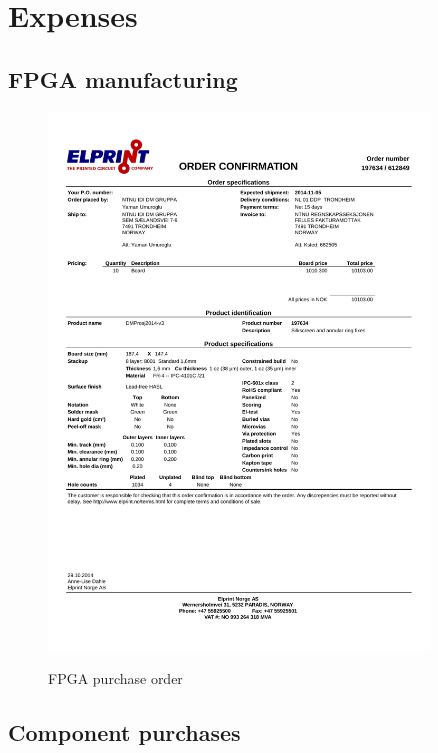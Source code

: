 \documentclass[../main/report.tex]{subfiles}
\begin{document}
\chapter{Expenses}

\section{FPGA manufacturing}

\begin{figure}[H]
   \centering
   \includegraphics[width=0.9\textwidth]{../appendix/assets/FPGA-purchase.pdf}
   \label{fig:fpga-order}
   \caption{FPGA purchase order}
\end{figure}

\section{Component purchases}
\end{document}
